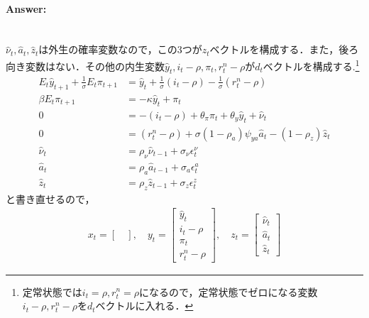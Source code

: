 \documentclass[a4j, dvipdfmx]{jarticle}
\begin{document}
\paragraph{Answer:}~\\
$\hat \nu_t, \hat a_t, \hat z_t$は外生の確率変数なので，この3つが$z_t$ベクトルを構成する．また，後ろ向き変数はない．その他の内生変数$\hat y_t, i_t-\rho, \pi_t, r^n_t - \rho$が$d_t$ベクトルを構成する.\footnote{定常状態では$i_t = \rho, r^n_t = \rho$になるので，定常状態でゼロになる変数$i_t - \rho, r^n_t - \rho$を$d_t$ベクトルに入れる．}
\begin{align}
E_t\hat{y}_{t+1} + \frac{1}{\sigma}E_t\pi_{t+1} &= \hat{y}_t + \frac{1}{\sigma}(i_t - \rho) - \frac{1}{\sigma} (r^n_t - \rho) \\
\beta E_t\pi_{t+1} &= -\kappa \hat{y}_t + \pi_t\\
0 &= -(i_t - \rho) + \theta_\pi \pi_t + \theta_y \hat{y}_t + \hat \nu_t\\
0 &= (r^n_t - \rho) + \sigma(1-\rho_a)\psi_{ya} \hat a_t - (1-\rho_z)\hat z_t\\
\hat \nu_t &= \rho_\nu \hat \nu_{t-1} + \sigma_\nu \epsilon^\nu_t\\
\hat a_t &= \rho_a \hat a_{t-1} + \sigma_a \epsilon^a_t\\
\hat z_t &= \rho_z \hat z_{t-1} + \sigma_z \epsilon^z_t
\end{align}
と書き直せるので，
\begin{align}
x_t = \begin{bmatrix} ~\end{bmatrix}, \quad y_t = \begin{bmatrix}\hat{y}_t \\ i_t - \rho \\ \pi_t \\ r^n_t - \rho\end{bmatrix}, \quad z_t = \begin{bmatrix}\hat \nu_t \\ \hat a_t \\ \hat z_t\end{bmatrix}
\end{align}
\end{document}
